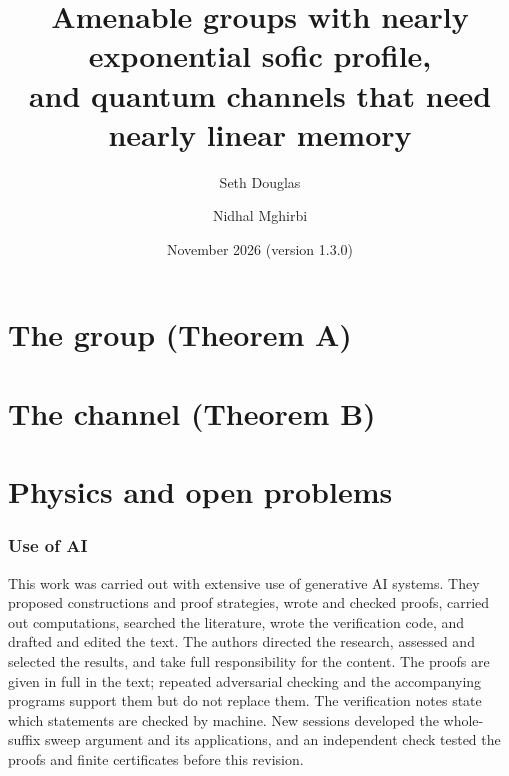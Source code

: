 \documentclass[11pt,a4paper]{article}
\title{Amenable groups with nearly exponential sofic profile,\\ and quantum channels that need nearly linear memory}
\author{Seth Douglas \and Nidhal Mghirbi}
\date{November 2026 (version 1.3.0)}
\theoremstyle{plain}
\theoremstyle{definition}
\theoremstyle{remark}
\begin{document}
\maketitle



{\small\tableofcontents}




\part{The group (Theorem A)}







\part{The channel (Theorem B)}







\part{Physics and open problems}



\section*{Use of AI}

This work was carried out with extensive use of generative AI systems. They proposed constructions and proof strategies, wrote and
checked proofs, carried out computations, searched the literature, wrote the verification code, and drafted and edited the text. The
authors directed the research, assessed and selected the results, and take full responsibility for the content. The proofs are given in
full in the text; repeated adversarial checking and the accompanying programs support them but do not replace them. The verification
notes state which statements are checked by machine. New sessions developed the whole-suffix sweep argument and its applications,
and an independent check tested the proofs and finite certificates before this revision.

\appendix












\end{document}
